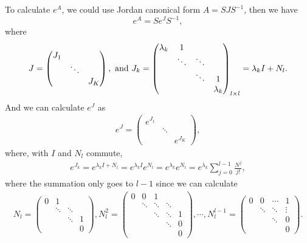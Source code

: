 \documentclass[11pt]{book}
\theoremstyle{definition}
\numberwithin{equation}{chapter}
\begin{document}
\medskip

To calculate $e^A$, we could use Jordan canonical form $A = SJS^{-1}$, then we have $$e^A = Se^JS^{-1},$$
where 
$$J = \begin{pmatrix}
    J_1 &  &  \\
     & \ddots &  \\
     &  & J_K
    \end{pmatrix}, \,\, {\rm and} \,\, J_k =  \begin{pmatrix}
    \lambda_k & 1 & & \\
     & \ddots & \ddots & \\
     &  & \ddots & 1 \\
     &  &  & \lambda_k
    \end{pmatrix}_{l\times l} = \lambda_k I + N_l.$$
And we can calculate $e^J$ as 
\begin{align*}
    e^J = \begin{pmatrix}
    e^{J_1} &  &  \\
     & \ddots &  \\
     &  & e^{J_K}
    \end{pmatrix},
\end{align*}
where, with $I$ and $N_l$ commute, 
\begin{align*}
    e^{J_k} = e^{\lambda_k I + N_l} = e^{\lambda_k I}e^{N_l} = e^{\lambda_k} e^{N_l} = e^{\lambda_k} \sum^{l-1}_{j=0}\frac{N^j}{j!},
\end{align*}
where the summation only goes to $l-1$ since we can calculate 
\begin{align*}
    N_l = \begin{pmatrix}
    0 & 1 & & \\
     & \ddots & \ddots & \\
     &  & \ddots & 1 \\
     &  &  & 0
    \end{pmatrix}, N_l^2 = \begin{pmatrix}
    0 & 0 & 1 & &\\
     & \ddots & \ddots & \ddots & \\
     &  & \ddots & \ddots & 1 \\
     &  &  & \ddots & 0 \\ 
     &  &  &  &  0
    \end{pmatrix}, \cdots, N_l^{l-1} = \begin{pmatrix}
    0 & 0 & \cdots & 1 \\
     & \ddots & \ddots & \vdots \\
     &  & \ddots & 0 \\
     &  &  & 0
    \end{pmatrix}.
\end{align*}
\end{document}
